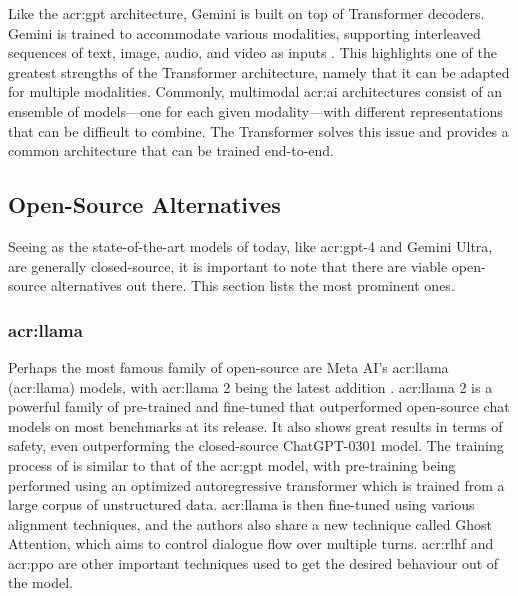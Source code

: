 Like the \acrshort{acr:gpt} architecture, Gemini is built on top of Transformer decoders. Gemini is trained to accommodate various modalities, supporting interleaved sequences of text, image, audio, and video as inputs \citep[3-4]{geminiteamGeminiFamilyHighly2023}. This highlights one of the greatest strengths of the Transformer architecture, namely that it can be adapted for multiple modalities. Commonly, multimodal \acrshort{acr:ai} architectures consist of an ensemble of models---one for each given modality---with different representations that can be difficult to combine. The Transformer solves this issue and provides a common architecture that can be trained end-to-end.

\subsection{Open-Source Alternatives}\label{subsec:open-source-llms}

Seeing as the state-of-the-art models of today, like \acrshort{acr:gpt}-4 and Gemini Ultra, are generally closed-source, it is important to note that there are viable open-source alternatives out there. This section lists the most prominent ones.

\subsubsection[LLaMA]{\acrshort{acr:llama}}

Perhaps the most famous family of open-source  are Meta AI's \acrshort{acr:llama} (\acrlong{acr:llama}) models, with \acrshort{acr:llama} 2 being the latest addition \citep{touvronLlamaOpenFoundation2023a}. \acrshort{acr:llama} 2 is a powerful family of pre-trained and fine-tuned  that outperformed open-source chat models on most benchmarks at its release. It also shows great results in terms of safety, even outperforming the closed-source ChatGPT-0301 model. The training process of  is similar to that of the \acrshort{acr:gpt} model, with pre-training being performed using an optimized autoregressive transformer which is trained from a large corpus of unstructured data. \acrshort{acr:llama} is then fine-tuned using various alignment techniques, and the authors also share a new technique called Ghost Attention, which aims to control dialogue flow over multiple turns. \gls{acr:rlhf} and \gls{acr:ppo} are other important techniques used to get the desired behaviour out of the model.

